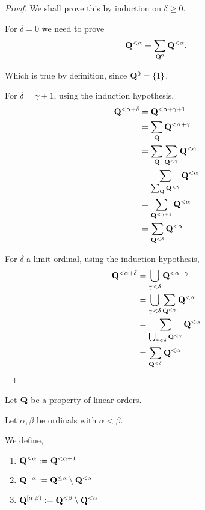 \begin{proof}
  We shall prove this by induction on $\delta \ge 0$.

  For $\delta = 0$ we need to prove
  \[
    \mathbf{Q}^{< \alpha} = \sum_{\mathbf{Q}^0}{\mathbf{Q}^{< \alpha}}.
  \]

  Which is true by definition, since $\mathbf{Q}^0 = \left\{ {1} \right\}$.

  For $\delta = \gamma + 1$, using the induction hypothesis,
  \begin{align*}
    \mathbf{Q}^{< \alpha + \delta}
     & = \mathbf{Q}^{< \alpha + \gamma + 1}                       \\
     & = \sum_{\mathbf{Q}}{\mathbf{Q}^{< \alpha + \gamma}}               \\
     & = \sum_{\mathbf{Q}}{\sum_{\mathbf{Q}^{< \gamma}}{\mathbf{Q}^{< \alpha}}} \\
     & = \sum_{\sum_{\mathbf{Q}}{\mathbf{Q}^{< \gamma}}}{\mathbf{Q}^{< \alpha}} \\
     & = \sum_{\mathbf{Q}^{< \gamma + 1}}{\mathbf{Q}^{< \alpha}}         \\
     & = \sum_{\mathbf{Q}^{< \delta}}{\mathbf{Q}^{< \alpha}}
  \end{align*}

  For $\delta$ a limit ordinal, using the induction hypothesis,
  \begin{align*}
    \mathbf{Q}^{< \alpha + \delta}
     & = \bigcup_{\gamma < \delta}{\mathbf{Q}^{< \alpha + \gamma}}               \\
     & = \bigcup_{\gamma < \delta}{\sum_{\mathbf{Q}^{< \gamma}}{\mathbf{Q}^{< \alpha}}} \\
     & = \sum_{\bigcup_{\gamma < \delta}{\mathbf{Q}^{< \gamma}}}{\mathbf{Q}^{< \alpha}} \\
     & = \sum_{\mathbf{Q}^{< \delta}}{\mathbf{Q}^{< \alpha}}
  \end{align*}

\end{proof}

\begin{definition}
  Let $\mathbf{Q}$ be a property of linear orders.

  Let $\alpha, \beta$ be ordinals with $\alpha < \beta$.

  We define,
  \begin{enumerate}
    \item $\mathbf{Q}^{\le \alpha} := \mathbf{Q}^{< \alpha + 1}$
    \item $\mathbf{Q}^{= \alpha} := \mathbf{Q}^{\le \alpha} \setminus \mathbf{Q}^{< \alpha}$
    \item $\mathbf{Q}^{[\alpha, \beta)} := \mathbf{Q}^{< \beta} \setminus \mathbf{Q}^{< \alpha}$
  \end{enumerate}
\end{definition}

